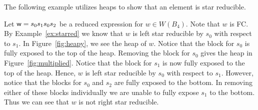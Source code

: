 The following example utilizes heaps to show that an element is star reducible.

\begin{example}\label{ex:starredheap}
Let $\mathsf{w}=s_0s_1s_0s_2$ be a reduced expression for $w \in W(B_4)$. Note that $w$ is FC. By Example~\ref{ex:starred} we know that $w$ is left star reducible by $s_0$ with respect to $s_1$. In Figure~\ref{fig:heapy}, we see the heap of $w$. Notice that the block for $s_0$ is fully exposed to the top of the heap. Removing the block for $s_0$ gives the heap in Figure~\ref{fig:multiplied}. Notice that the block for $s_1$ is now fully exposed to the top of the heap. Hence, $w$ is left star reducible by $s_0$ with respect to $s_1$. However, notice that the blocks for $s_0$ and $s_2$ are fully exposed to the bottom. In removing either of these blocks individually we are unable to fully expose $s_1$ to the bottom. Thus we can see that $w$ is not right star reducible.  
\end{example}



